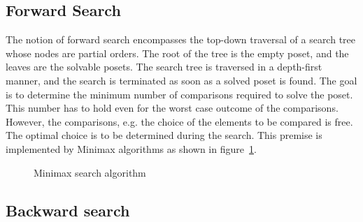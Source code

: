 \documentclass[10pt,journal,compsoc]{IEEEtran}
\begin{document}
\subsection{Forward Search}
The notion of forward search encompasses the top-down traversal of a search tree whose nodes are partial orders.
The root of the tree is the empty poset, and the leaves are the solvable posets. 
The search tree is traversed in a depth-first manner, and the search is terminated as soon as a solved poset is found.
The goal is to determine the minimum number of comparisons required to solve the poset. 
This number has to hold even for the worst case outcome of the comparisons. 
However, the comparisons, e.g. the choice of the elements to be compared is free. 
The optimal choice is to be determined during the search.
This premise is implemented by Minimax algorithms as shown in figure~\ref{fig:minimax_search}.

\begin{figure}
  \caption{Minimax search algorithm} \label{fig:minimax_search}
\end{figure}

\subsection{Backward search}
\end{document}
